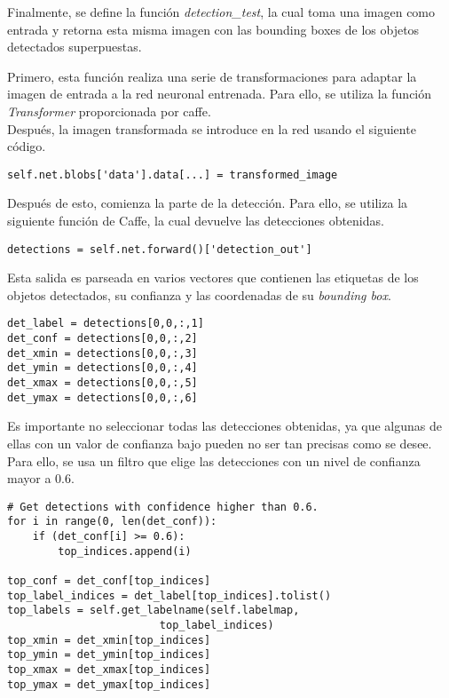 \documentclass[a4paper, 12pt, spanish, chapterprefix, numbers=noenddot]{book}
\begin{document}
Finalmente, se define la función \textit{detection\_test}, la cual toma una imagen como entrada y retorna esta misma imagen con las bounding boxes de los objetos detectados superpuestas.

Primero, esta función realiza una serie de transformaciones para adaptar la imagen de entrada a la red neuronal entrenada. Para ello, se utiliza la función \textit{Transformer} proporcionada por caffe.\\

Después, la imagen transformada se introduce en la red usando el siguiente código.\\

\begin{lstlisting}[frame=single]
self.net.blobs['data'].data[...] = transformed_image
\end{lstlisting}

Después de esto, comienza la parte de la detección. Para ello, se utiliza la siguiente función de Caffe, la cual devuelve las detecciones obtenidas.\\

\begin{lstlisting}[frame=single]
detections = self.net.forward()['detection_out']
\end{lstlisting}

Esta salida es parseada en varios vectores que contienen las etiquetas de los objetos detectados, su confianza y las coordenadas de su \textit{bounding box}.\\

\begin{lstlisting}[frame=single]
det_label = detections[0,0,:,1] 
det_conf = detections[0,0,:,2] 
det_xmin = detections[0,0,:,3] 
det_ymin = detections[0,0,:,4] 
det_xmax = detections[0,0,:,5] 
det_ymax = detections[0,0,:,6]
\end{lstlisting}

Es importante no seleccionar todas las detecciones obtenidas, ya que algunas de ellas con un valor de confianza bajo pueden no ser tan precisas como se desee. Para ello, se usa un filtro que elige las detecciones con un nivel de confianza mayor a 0.6.\\

\begin{lstlisting}[frame=single]
# Get detections with confidence higher than 0.6. 
for i in range(0, len(det_conf)): 
    if (det_conf[i] >= 0.6): 
        top_indices.append(i) 

top_conf = det_conf[top_indices] 
top_label_indices = det_label[top_indices].tolist() 
top_labels = self.get_labelname(self.labelmap, 
						top_label_indices) 
top_xmin = det_xmin[top_indices] 
top_ymin = det_ymin[top_indices] 
top_xmax = det_xmax[top_indices] 
top_ymax = det_ymax[top_indices] 
\end{lstlisting}
\end{document}
